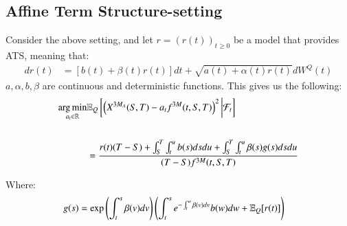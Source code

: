\newpage 

\subsection{Affine Term Structure-setting}

\begin{proposition}
Consider the above setting, and let $r = (r(t))_{t\geq 0}$ be a model that provides ATS, meaning that: 
\begin{align*}
dr(t) &= [b(t) + \beta(t)r(t)]dt + \sqrt{a(t) + \alpha(t)r(t)}dW^{Q}(t)
\end{align*}
$a, \alpha, b, \beta$ are continuous and deterministic functions. This gives us the following: 
\begin{align*}
\operatorname*{arg\,min}\limits_{a_{t} \in \mathbb{R}}&\mathbb{E}_{Q}\left[
\left(
X^{3M_{A}}(S,T)- a_{t}f^{3M}(t,S,T)
\right)^{2}
\bigg{|}\mathcal{F}_{t}
\right] \\
\\
&= \frac{
r(t)(T-S)
+ \int_{S}^{T}\int_{t}^{u}b(s)dsdu 
+ \int_{S}^{T}\int_{t}^{u}\beta(s)g(s)dsdu
}{
(T-S)f^{3M}(t,S,T)
}
\end{align*}

Where: 
\begin{align*}
g(s) &= \exp\left(
\int_{t}^{s}\beta(v)dv
\right)
\left(
\int_{t}^{s}e^{-\int_{t}^{w}\beta(v)dv}b(w)dw + \mathbb{E}_{Q}[r(t)]
\right) 
\end{align*}

\end{proposition}

